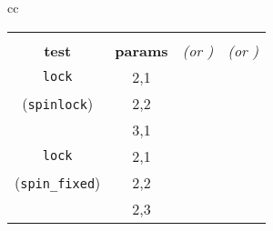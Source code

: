 \begin{table}[t]
	\begin{center}
		\footnotesize
		\begin{tabular}{cc}
		\begin{tabular}{cc||r|r}
			& & \cpu{\bf cpu (s)} & \ints{\bf SS size} \\
			\bf test & \bf params & \em (or \ETAdag{\bf \em ETA}) & \em (or \ETAdag{\bf \em est.}) \\
			\hline
			\hline
			{\tt lock}
			& 2,1 & \cpu{2.49} & \ints{4} \\ %
			({\tt spinlock})
			& 2,2 & \cpu{174.26} & \ints{1702} \\ %
			& 3,1 & \cpu{26.97} & \ints{246} \\ %
			\hline
			{\tt lock}
			& 2,1 & \cpu{2.47} & \ints{4} \\ %
			({\tt spin\_fixed})
			& 2,2 & \cpu{94.64} & \ints{998} \\ %
			& 2,3 & \ETAdag{28h 6m} & \ETAdag{486966} \\ %

\end{tabular}
\end{tabular}
\end{center}
\end{table}

